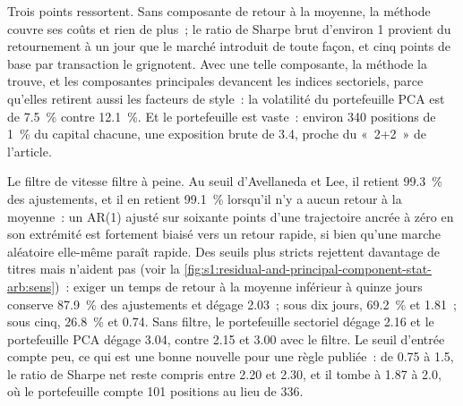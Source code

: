 Trois points ressortent. Sans composante de retour à la moyenne, la méthode couvre ses coûts et rien de plus~; le ratio de Sharpe brut d'environ 1 provient du
retournement à un jour que le marché introduit de toute façon, et cinq points de base par transaction le grignotent. Avec une telle composante, la méthode la trouve, et les composantes principales devancent les
indices sectoriels, parce qu'elles retirent aussi les facteurs de style~: la volatilité du portefeuille PCA est de 7.5~\% contre 12.1~\%. Et le portefeuille est vaste~: environ 340 positions de 1~\% du
capital chacune, une exposition brute de 3.4, proche du «~2+2~» de l'article.

Le filtre de vitesse filtre à peine. Au seuil d'Avellaneda et Lee, il retient 99.3~\% des ajustements, et il en retient 99.1~\% lorsqu'il n'y a aucun retour à la moyenne~:
un AR(1) ajusté sur soixante points d'une trajectoire ancrée à zéro en son extrémité est fortement biaisé vers un retour rapide, si bien qu'une marche aléatoire elle-même paraît rapide. Des seuils plus
stricts rejettent davantage de titres mais n'aident pas (voir la \cref{fig:s1:residual-and-principal-component-stat-arb:sens})~: exiger un temps de retour à la moyenne inférieur à quinze
jours conserve 87.9~\% des ajustements et dégage 2.03~; sous dix jours, 69.2~\% et 1.81~; sous cinq, 26.8~\% et 0.74. Sans filtre, le portefeuille sectoriel dégage 2.16 et
le portefeuille PCA dégage 3.04, contre 2.15 et 3.00 avec le filtre. Le seuil d'entrée compte peu, ce qui est une bonne nouvelle pour une règle publiée~: de 0.75 à 1.5, le ratio de Sharpe net
reste compris entre 2.20 et 2.30, et il tombe à 1.87 à 2.0, où le portefeuille compte 101 positions au lieu de 336.

